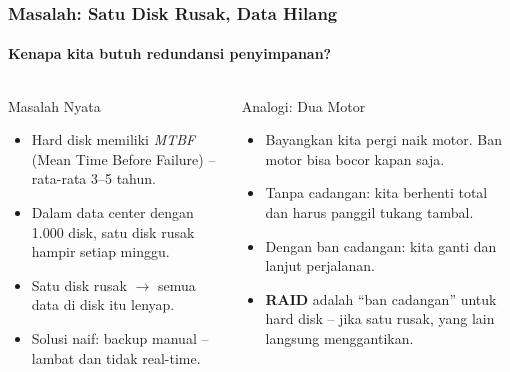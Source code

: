 \documentclass[t,aspectratio=169,xcolor=dvipsnames]{beamer}
\begin{document}
\begin{frame}
    \frametitle{Masalah: Satu Disk Rusak, Data Hilang}
    \framesubtitle{Kenapa kita butuh redundansi penyimpanan?}

    \begin{columns}[T]
        \begin{alertblock}{Masalah Nyata}
            \small
            \begin{itemize}
                \item Hard disk memiliki \textit{MTBF} (Mean Time Before Failure) -- rata-rata 3--5 tahun.
                \item Dalam data center dengan 1.000 disk, satu disk rusak hampir setiap minggu.
                \item Satu disk rusak $\to$ semua data di disk itu lenyap.
                \item Solusi naif: backup manual -- lambat dan tidak real-time.
            \end{itemize}
        \end{alertblock}

        \begin{exampleblock}{Analogi: Dua Motor}
            \small
            \begin{itemize}
                \item Bayangkan kita pergi naik motor. Ban motor bisa bocor kapan saja.
                \item Tanpa cadangan: kita berhenti total dan harus panggil tukang tambal.
                \item Dengan ban cadangan: kita ganti dan lanjut perjalanan.
                \item \textbf{RAID} adalah ``ban cadangan'' untuk hard disk -- jika satu rusak, yang lain langsung menggantikan.
            \end{itemize}
        \end{exampleblock}
    \end{columns}
\end{frame}
\end{document}
